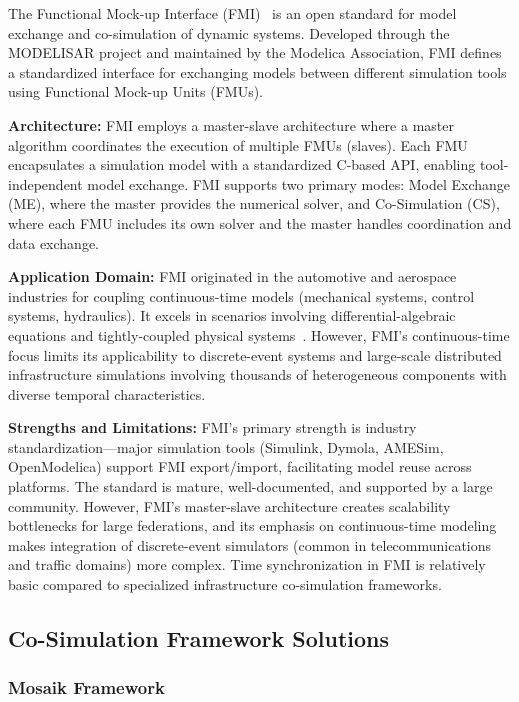 The Functional Mock-up Interface (FMI)~\cite{fmi_standard} is an open standard for model exchange and co-simulation of dynamic systems. Developed through the MODELISAR project and maintained by the Modelica Association, FMI defines a standardized interface for exchanging models between different simulation tools using Functional Mock-up Units (FMUs).

\textbf{Architecture:} FMI employs a master-slave architecture where a master algorithm coordinates the execution of multiple FMUs (slaves). Each FMU encapsulates a simulation model with a standardized C-based API, enabling tool-independent model exchange. FMI supports two primary modes: Model Exchange (ME), where the master provides the numerical solver, and Co-Simulation (CS), where each FMU includes its own solver and the master handles coordination and data exchange.

\textbf{Application Domain:} FMI originated in the automotive and aerospace industries for coupling continuous-time models (mechanical systems, control systems, hydraulics). It excels in scenarios involving differential-algebraic equations and tightly-coupled physical systems~\cite{fmi_application}. However, FMI's continuous-time focus limits its applicability to discrete-event systems and large-scale distributed infrastructure simulations involving thousands of heterogeneous components with diverse temporal characteristics.

\textbf{Strengths and Limitations:} FMI's primary strength is industry standardization—major simulation tools (Simulink, Dymola, AMESim, OpenModelica) support FMI export/import, facilitating model reuse across platforms. The standard is mature, well-documented, and supported by a large community. However, FMI's master-slave architecture creates scalability bottlenecks for large federations, and its emphasis on continuous-time modeling makes integration of discrete-event simulators (common in telecommunications and traffic domains) more complex. Time synchronization in FMI is relatively basic compared to specialized infrastructure co-simulation frameworks.


\subsection{Co-Simulation Framework Solutions}

\subsubsection{Mosaik Framework}

